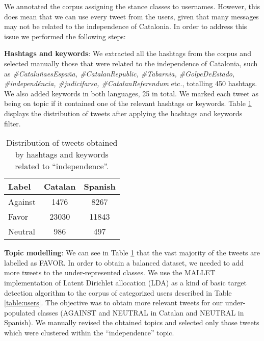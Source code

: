 \documentclass[10pt, a4paper]{article}
\begin{document}
We annotated the corpus assigning the stance classes to usernames. However, this does mean that we can use every tweet from the users, given that many messages may not be related to the independence of Catalonia. In order to address this issue we performed the following steps:

\textbf{Hashtags and keywords}: We extracted all the hashtags from the corpus and selected manually those that were related to the independence of Catalonia, such as \textit{\#Catalu\~naesEspa\~na, \#CatalanRepublic, \#Tabarnia, \#GolpeDeEstado, \#independ\'encia, \#judicifarsa, \#CatalanReferendum} etc., totalling 450 hashtags. We also added keywords in both languages, 25 in total. We marked each tweet as being on topic if it contained one of the relevant hashtags or keywords. Table \ref{tab:relevanttweets} displays the distribution of tweets after applying the hashtags and keywords filter.

\begin{table}[!ht]
\centering
\begin{tabular}{lcc} \hline
Label & Catalan & Spanish\\ \hline
 Against & 1476 & 8267 \\
Favor & 23030 & 11843 \\
Neutral & 986 & 497 \\ \hline
\end{tabular}
\caption{Distribution of tweets obtained by hashtags and keywords related to ``independence''.}\label{tab:relevanttweets}
\end{table}

\textbf{Topic modelling}: We can see in Table \ref{tab:relevanttweets} that the vast majority of the tweets are labelled as FAVOR. In order to obtain a balanced dataset, we needed to add more tweets to the under-represented classes. We use the MALLET \cite{McCallumMALLET} implementation of Latent Dirichlet allocation (LDA) \cite{Blei:2003:LDA:944919.944937} as a kind of basic target detection algorithm to the corpus of categorized users described in Table \ref{table:users}. The objective was to obtain more relevant tweets for our under-populated classes (AGAINST and NEUTRAL in Catalan and NEUTRAL in Spanish). We manually revised the obtained topics and selected only those tweets which were clustered within the ``independence'' topic.

\end{document}
